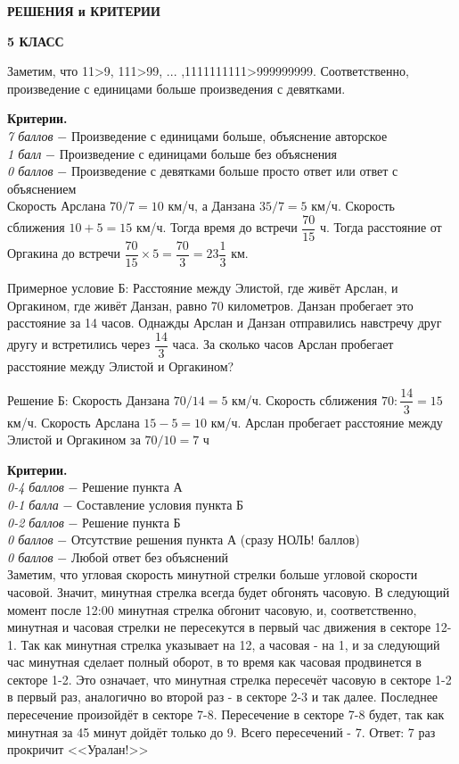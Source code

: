 \centerline{\bf \Large  РЕШЕНИЯ и КРИТЕРИИ}

\centerline{\bf \Large  5 КЛАСС}

 Заметим, что 11>9, 111>99, ... ,1111111111>999999999. Соответственно, произведение с единицами больше произведения с девятками. \par

\textbf{Критерии.} \\
\textit{7 баллов} $-$ Произведение с единицами больше, объяснение авторское\\
\textit{1 балл} $-$  Произведение с единицами больше без объяснения\\ 
\textit{0 баллов} $-$ Произведение с девятками больше просто ответ или ответ с объяснением \\

 Скорость Арслана $70/7=10$ км/ч, а Данзана $35/7=5$ км/ч. Скорость сближения $10+5=15$ км/ч. Тогда время до встречи $\dfrac{70}{15}$ ч. Тогда расстояние от Оргакина до встречи $\dfrac{70}{15}\times 5 = \dfrac{70}{3} = 23 \dfrac{1}{3}$ км.

Примерное условие Б: Расстояние между Элистой, где живёт Арслан, и Оргакином, где живёт Данзан, равно 70 километров. Данзан пробегает это расстояние за 14 часов. Однажды Арслан и Данзан отправились навстречу друг другу и встретились через $\dfrac{14}{3}$ часа. За сколько часов Арслан пробегает расстояние между Элистой и Оргакином? 

Решение Б: Скорость Данзана $70/14=5$ км/ч. Скорость сближения $70:\dfrac{14}{3}=15$ км/ч. Скорость Арслана $15 - 5 = 10$ км/ч. Арслан пробегает расстояние между Элистой и Оргакином за $70/10=7$ ч\par\par

\textbf{Критерии.} \\
\textit{0-4 баллов} $-$ Решение пункта А\\
\textit{0-1 балла} $-$ Составление условия пункта Б \\
\textit{0-2 баллов} $-$ Решение пункта Б\\
\textit{0 баллов} $-$ Отсутствие решения пункта А (сразу НОЛЬ! баллов)\\
\textit{0 баллов} $-$ Любой ответ без объяснений\\

 Заметим, что угловая скорость минутной стрелки больше угловой скорости часовой. Значит, минутная стрелка всегда будет обгонять часовую. В следующий момент после 12:00 минутная стрелка обгонит часовую, и, соответственно, минутная и часовая стрелки не пересекутся в первый час движения в секторе 12-1. Так как минутная стрелка указывает на 12, а часовая - на 1, и за следующий час минутная сделает полный оборот, в то время как часовая продвинется в секторе 1-2. Это означает, что минутная стрелка пересечёт часовую в секторе 1-2 в первый раз, аналогично во второй раз - в секторе 2-3 и так далее. Последнее пересечение произойдёт в секторе 7-8. Пересечение в секторе 7-8 будет, так как минутная за 45 минут дойдёт только до 9. Всего пересечений - 7. Ответ: 7 раз прокричит <<Уралан!>>\par

